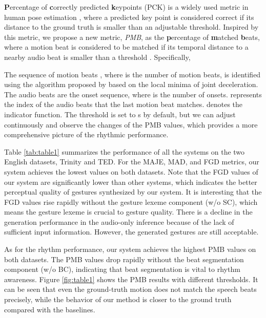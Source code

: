 \documentclass[acmtog,authorversion]{acmart}
\begin{document}
\textbf{P}ercentage of \textbf{c}orrectly predicted \textbf{k}eypoints (PCK)  is a widely used metric in human pose estimation \cite{Wei_2016_openpose, mehta2017vnect}, where a predicted key point is considered correct if its distance to the ground truth is smaller than an adjustable threshold. Inspired by this metric, we propose a new metric, \emph{PMB}, as the \textbf{p}ercentage of \textbf{m}atched \textbf{b}eats, where a motion beat is considered to be matched if its temporal distance to a nearby audio beat is smaller than a threshold . Specifically,

The sequence of motion beats , where  is the number of motion beats, is identified using the algorithm proposed by \citet{ho2013motionbeat} based on the local minima of joint deceleration. 
The audio beats  are the onset sequence, where  is the number of onsets.  represents the index of the audio beats that the last motion beat matches.  denotes the indicator function. The threshold  is set to s by default, but we can adjust  continuously and observe the changes of the PMB values, which provides a more comprehensive picture of the rhythmic performance.

Table \ref{tab:table1} summarizes the performance of all the systems on the two English datasets, Trinity and TED. For the MAJE, MAD, and FGD metrics, our system achieves the lowest values on both datasets. Note that the FGD values of our system are significantly lower than other systems, which indicates the better perceptual quality of gestures synthesized by our system. It is interesting that the FGD values rise rapidly without the gesture lexeme component (w/o SC), which means the gesture lexeme is crucial to gesture quality. There is a decline in the generation performance in the audio-only inference because of the lack of sufficient input information. However, the generated gestures are still acceptable.

As for the rhythm performance, our system achieves the highest PMB values on both datasets. The PMB values drop rapidly without the beat segmentation component (w/o BC), indicating that beat segmentation is vital to rhythm awareness. Figure \ref{fig:table1} shows the PMB results with different thresholds. It can be seen that even the ground-truth motion does not match the speech beats precisely, while the behavior of our method is closer to the ground truth compared  with the baselines.
\end{document}
